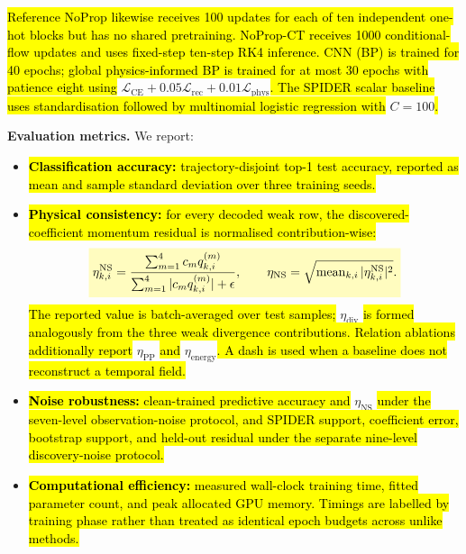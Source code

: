 \documentclass[preprint,12pt]{elsarticle}
\newcommand{\rev}[1]{\hl{#1}}
\newcommand{\revmath}[1]{\colorbox{yellow!25}{$#1$}}
\begin{document}
\rev{Reference NoProp likewise receives 100 updates for each of ten independent one-hot blocks but has no shared pretraining. NoProp-CT receives 1000 conditional-flow updates and uses fixed-step ten-step RK4 inference. CNN (BP) is trained for 40 epochs; global physics-informed BP is trained for at most 30 epochs with patience eight using }\revmath{\mathcal L_{\mathrm{CE}}+0.05\mathcal L_{\mathrm{rec}}+0.01\mathcal L_{\mathrm{phys}}}\rev{. The SPIDER scalar baseline uses standardisation followed by multinomial logistic regression with }\revmath{C=100}\rev{.}

\textbf{Evaluation metrics.} We report:

\begin{itemize}
    \item \rev{\textbf{Classification accuracy:} trajectory-disjoint top-1 test accuracy, reported as mean and sample standard deviation over three training seeds.}
    \item \rev{\textbf{Physical consistency:} for every decoded weak row, the discovered-coefficient momentum residual is normalised contribution-wise:}
    \begin{equation}
    \label{eq:relative-residual}
    \revmath{\displaystyle
    \eta_{k,i}^{\mathrm{NS}}=
    \frac{\sum_{m=1}^{4}c_mq_{k,i}^{(m)}}
    {\sum_{m=1}^{4}|c_mq_{k,i}^{(m)}|+\epsilon},\qquad
    \eta_{\mathrm{NS}}=
    \sqrt{\operatorname{mean}_{k,i}|\eta_{k,i}^{\mathrm{NS}}|^2}.}
    \end{equation}
    \rev{The reported value is batch-averaged over test samples; }\revmath{\eta_{\mathrm{div}}}\rev{ is formed analogously from the three weak divergence contributions. Relation ablations additionally report }\revmath{\eta_{\mathrm{PP}}}\rev{ and }\revmath{\eta_{\mathrm{energy}}}\rev{. A dash is used when a baseline does not reconstruct a temporal field.}
    \item \rev{\textbf{Noise robustness:} clean-trained predictive accuracy and }\revmath{\eta_{\mathrm{NS}}}\rev{ under the seven-level observation-noise protocol, and SPIDER support, coefficient error, bootstrap support, and held-out residual under the separate nine-level discovery-noise protocol.}
    \item \rev{\textbf{Computational efficiency:} measured wall-clock training time, fitted parameter count, and peak allocated GPU memory. Timings are labelled by training phase rather than treated as identical epoch budgets across unlike methods.}
\end{itemize}
\end{document}
